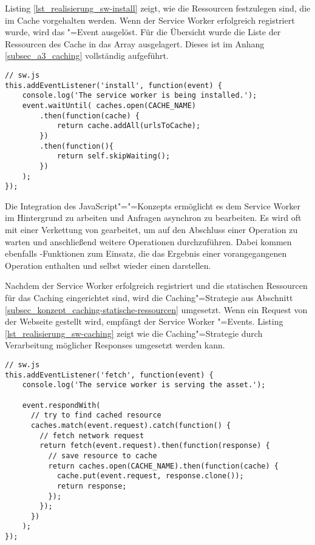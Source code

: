 Listing \ref{lst_realisierung_sw-install} zeigt, wie die Ressourcen festzulegen sind, die im Cache vorgehalten werden. Wenn der Service Worker erfolgreich registriert wurde, wird das "=Event ausgelöst. Für die Übersicht wurde die Liste der Ressourcen des Cache in das Array  ausgelagert. Dieses ist im Anhang \ref{subsec_a3_caching} vollständig aufgeführt.\\

\begin{lstlisting}[caption={Ressourcen festlegen, die im Zwischenspeicher vorgehalten werden sollen},label={lst_realisierung_sw-install}, frame=single]
// sw.js
this.addEventListener('install', function(event) {
    console.log('The service worker is being installed.');
    event.waitUntil( caches.open(CACHE_NAME)
        .then(function(cache) {
            return cache.addAll(urlsToCache);
        })
        .then(function(){
            return self.skipWaiting();
        })
    );
});
\end{lstlisting}
  
Die Integration des JavaScript"="=Konzepts ermöglicht es dem Service Worker im Hintergrund zu arbeiten und Anfragen asynchron zu bearbeiten. Es wird oft mit einer Verkettung von  gearbeitet, um auf den Abschluss einer Operation zu warten und anschließend weitere Operationen durchzuführen. Dabei kommen ebenfalls -Funktionen zum Einsatz, die das Ergebnis einer vorangegangenen Operation enthalten und selbst wieder einen  darstellen.  

\newpage
Nachdem der Service Worker erfolgreich registriert und die statischen Ressourcen für das Caching eingerichtet sind, wird die Caching"=Strategie aus Abschnitt \ref{subsec_konzept_caching-statische-ressourcen} umgesetzt. Wenn ein Request von der Webseite gestellt wird, empfängt der Service Worker "=Events. Listing \ref{lst_realisierung_sw-caching} zeigt wie die Caching"=Strategie durch Verarbeitung möglicher Responses umgesetzt werden kann. \\

\begin{lstlisting}[caption={Verarbeitung empfangener Requests und Auswertung möglicher Responses im Service Worker},label={lst_realisierung_sw-caching}, frame=single]
// sw.js
this.addEventListener('fetch', function(event) {
    console.log('The service worker is serving the asset.');

    event.respondWith(
      // try to find cached resource
      caches.match(event.request).catch(function() {
        // fetch network request
        return fetch(event.request).then(function(response) {
          // save resource to cache
          return caches.open(CACHE_NAME).then(function(cache) {
            cache.put(event.request, response.clone());
            return response;
          });  
        });
      })
    );
});
\end{lstlisting}

